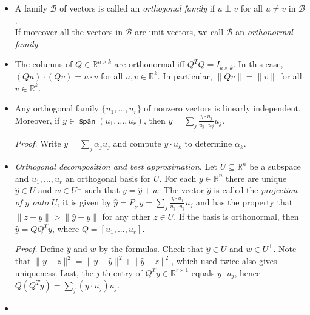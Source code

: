 \documentclass[11pt]{article}
\newcommand{\1}{\mathbf{1}}
\newcommand{\proj}[1]{P_{\!\!{}_{#1}\,}}
\newcommand{\0}{\mathbf{0}}
\newcommand{\B}{\mathcal{B}}
\newcommand{\R}{\mathbb{R}}
\DeclareMathOperator{\myspan}{\mathsf{span}}
\DeclareMathOperator{\mydot}{\boldsymbol{\cdot}}
\begin{document}
\begin{itemize}
\item

A family $\B$ of vectors is called an \emph{orthogonal family} if $u \perp v$ for all $u \ne v$ in $\B$.
\\
If moreover all the vectors in $\B$ are unit vectors, we call $\B$ an \emph{orthonormal family}.

\item

The columns of $Q \in \R^{n \times k}$ are orthonormal iff $Q^T Q = I_{k \times k}$.
In this case,
$(Qu) \mydot (Qv) = u \mydot v$ for all $u,v \in \R^k$.
In particular, $\|Qv\| = \|v\|$ for all $v \in \R^k$.


\item

Any orthogonal family $\{u_1,\dots,u_r\}$ of nonzero vectors is linearly independent.
Moreover, if $y \in \myspan(u_1,\dots,u_r)$, then
$y = \sum_j \frac{y \mydot u_j}{u_j \mydot u_j}  u_j$.

\emph{Proof.}
Write $y = \sum_j \alpha_j u_j$ and compute $y \mydot u_k$ to determine $\alpha_k$.

\item

\emph{Orthogonal decomposition and best approximation.}
Let $U \subseteq \R^n$ be a subspace and $u_1,\dots,u_r$ an orthogonal basis for $U$.
For each $y \in \R^n$ there are unique $\hat{y} \in U$ and $w \in U^\perp$ such that $y = \hat{y}+w$.
The vector $\hat{y}$ is called the \emph{projection of $y$ onto $U$}, it is given by
$\hat{y} = \proj{U} y = \sum_j \frac{y \mydot u_j}{u_j \mydot u_j}  u_j$ and has the property that $\|z-y\| > \|\hat{y} - y\|$ for any other $z \in U$.
If the basis is orthonormal, then $\hat{y}=Q Q^T y$, where $Q = [u_1,...,u_r]$.

\emph{Proof.}
Define $\hat{y}$ and $w$ by the formulas. Check that $\hat{y} \in U$ and $w \in U^\perp$.
Note that $\|y-z\|^2 = \|y-\hat{y}\|^2 + \|\hat{y}-z\|^2$, which used twice also gives uniqueness.
Last, the $j$-th entry of $Q^T y \in \R^{r\times 1}$ equals $y \mydot u_j$, hence $Q(Q^Ty) = \sum_j (y \mydot u_j)u_j$.

\item


\end{itemize}
\end{document}
